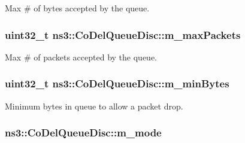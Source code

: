 Max \# of bytes accepted by the queue. 

\subsubsection[{\texorpdfstring{m\+\_\+max\+Packets}{m_maxPackets}}]{\setlength{\rightskip}{0pt plus 5cm}uint32\+\_\+t ns3\+::\+Co\+Del\+Queue\+Disc\+::m\+\_\+max\+Packets\hspace{0.3cm}{\ttfamily [private]}}\hypertarget{classns3_1_1CoDelQueueDisc_a806f6d4be982deffa2369d21765ab7ae}{}\label{classns3_1_1CoDelQueueDisc_a806f6d4be982deffa2369d21765ab7ae}


Max \# of packets accepted by the queue. 

\subsubsection[{\texorpdfstring{m\+\_\+min\+Bytes}{m_minBytes}}]{\setlength{\rightskip}{0pt plus 5cm}uint32\+\_\+t ns3\+::\+Co\+Del\+Queue\+Disc\+::m\+\_\+min\+Bytes\hspace{0.3cm}{\ttfamily [private]}}\hypertarget{classns3_1_1CoDelQueueDisc_a508ecc494f78426c539caa21c7109bc2}{}\label{classns3_1_1CoDelQueueDisc_a508ecc494f78426c539caa21c7109bc2}


Minimum bytes in queue to allow a packet drop. 

\subsubsection[{\texorpdfstring{m\+\_\+mode}{m_mode}}]{ ns3\+::\+Co\+Del\+Queue\+Disc\+::m\+\_\+mode\hspace{0.3cm}{\ttfamily [private]}}\hypertarget{classns3_1_1CoDelQueueDisc_ab7948d66bebfcc5c1ac4e0d47636a068}{}\label{classns3_1_1CoDelQueueDisc_ab7948d66bebfcc5c1ac4e0d47636a068}


